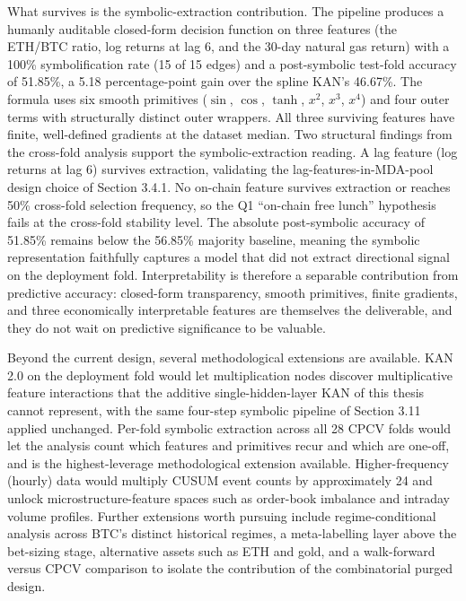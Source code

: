 What survives is the symbolic-extraction contribution. The pipeline produces a humanly auditable closed-form decision function on three features (the ETH/BTC ratio, log returns at lag 6, and the 30-day natural gas return) with a 100\% symbolification rate (15 of 15 edges) and a post-symbolic test-fold accuracy of 51.85\%, a 5.18 percentage-point gain over the spline KAN's 46.67\%. The formula uses six smooth primitives ($\sin$, $\cos$, $\tanh$, $x^2$, $x^3$, $x^4$) and four outer terms with structurally distinct outer wrappers. All three surviving features have finite, well-defined gradients at the dataset median. Two structural findings from the cross-fold analysis support the symbolic-extraction reading. A lag feature (log returns at lag 6) survives extraction, validating the lag-features-in-MDA-pool design choice of Section 3.4.1. No on-chain feature survives extraction or reaches 50\% cross-fold selection frequency, so the Q1 ``on-chain free lunch'' hypothesis fails at the cross-fold stability level. The absolute post-symbolic accuracy of 51.85\% remains below the 56.85\% majority baseline, meaning the symbolic representation faithfully captures a model that did not extract directional signal on the deployment fold. Interpretability is therefore a separable contribution from predictive accuracy: closed-form transparency, smooth primitives, finite gradients, and three economically interpretable features are themselves the deliverable, and they do not wait on predictive significance to be valuable.

Beyond the current design, several methodological extensions are available. KAN 2.0 on the deployment fold \citep{liu_kan2_2024} would let multiplication nodes discover multiplicative feature interactions that the additive single-hidden-layer KAN of this thesis cannot represent, with the same four-step symbolic pipeline of Section 3.11 applied unchanged. Per-fold symbolic extraction across all 28 CPCV folds would let the analysis count which features and primitives recur and which are one-off, and is the highest-leverage methodological extension available. Higher-frequency (hourly) data would multiply CUSUM event counts by approximately 24 and unlock microstructure-feature spaces such as order-book imbalance and intraday volume profiles. Further extensions worth pursuing include regime-conditional analysis across BTC's distinct historical regimes, a meta-labelling layer \citep{singh_joubert_2019} above the bet-sizing stage, alternative assets such as ETH and gold, and a walk-forward versus CPCV comparison to isolate the contribution of the combinatorial purged design.

